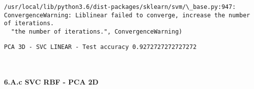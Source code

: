 \documentclass[11pt]{article}
\begin{document}
    \begin{Verbatim}[commandchars=\\\{\}]
/usr/local/lib/python3.6/dist-packages/sklearn/svm/\_base.py:947: ConvergenceWarning: Liblinear failed to converge, increase the number of iterations.
  "the number of iterations.", ConvergenceWarning)

    \end{Verbatim}

    \begin{Verbatim}[commandchars=\\\{\}]
PCA 3D - SVC LINEAR - Test accuracy 0.9272727272727272

    \end{Verbatim}

    \begin{center}
    \end{center}
    { \hspace*{\fill} \\}
    
    \hypertarget{a.c-svc-rbf---pca-2d}{%
\paragraph{6.A.c SVC RBF - PCA 2D}\label{a.c-svc-rbf---pca-2d}}
\end{document}
